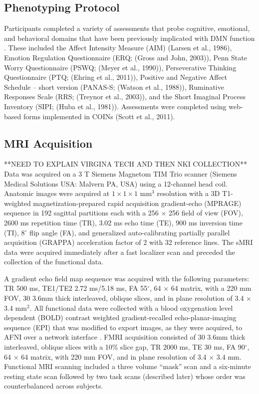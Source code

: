 \subsection{Phenotyping Protocol}
Participants completed a variety of assessments that probe cognitive, emotional, and behavioral domains that have been previously implicated with DMN function \cite{Andrews_Hanna2014,Buckner2008,Hamilton2011,Sheline2009}. These included the Affect Intensity Measure (AIM) (Larsen et al., 1986), Emotion Regulation Questionnaire (ERQ; (Gross and John, 2003)), Penn State Worry Questionnaire (PSWQ; (Meyer et al., 1990)), Perseverative Thinking Questionnaire (PTQ; (Ehring et al., 2011)), Positive and Negative Affect Schedule -- short version (PANAS-S; (Watson et al., 1988)), Ruminative Responses Scale (RRS; (Treynor et al., 2003)), and the Short Imaginal Process Inventory (SIPI; (Huba et al., 1981)). Assessments were completed using web-based forms implemented in COINs (Scott et al., 2011). 

\subsection{MRI Acquisition}
**NEED TO EXPLAIN VIRGINA TECH AND THEN NKI COLLECTION**
Data was acquired on a 3 T Siemens Magnetom TIM Trio scanner (Siemens Medical Solutions USA: Malvern PA, USA) using a 12-channel head coil. Anatomic images were acquired at $1 \times 1 \times 1$ mm$^{3}$ resolution with a 3D T1-weighted magnetization-prepared rapid acquisition gradient-echo (MPRAGE) sequence \cite{Mugler_1990} in 192 sagittal partitions each with a 256 $\times$ 256 field of view (FOV), 2600 ms repetition time (TR), 3.02 ms echo time (TE), 900 ms inversion time (TI), 8$^\circ$ flip angle (FA), and generalized auto-calibrating partially parallel acquisition (GRAPPA) \cite{Griswold_2002} acceleration factor of 2 with 32 reference lines. The sMRI data were acquired immediately after a fast localizer scan and preceded the collection of the functional data. 

A gradient echo field map sequence was acquired with the following parameters: TR 500 ms, TE1/TE2 2.72 ms/5.18 ms, FA 55$^\circ$, 64 $\times$ 64 matrix, with a 220 mm FOV, 30 3.6mm thick interleaved, oblique slices, and in plane resolution of 3.4 $\times$ 3.4 mm$^{2}$. All functional data were collected with a blood oxygenation level dependent (BOLD) contrast weighted gradient-recalled echo-planar-imaging sequence (EPI) that was modified to export images, as they were acquired, to AFNI over a network interface \cite{Cox_1995,Cox_1996,LaConte_2007}. FMRI acquisition consisted of 30 3.6mm thick interleaved, oblique slices with a 10\% slice gap, TR 2000 ms, TE 30 ms, FA 90$^\circ$, 64 $\times$ 64 matrix, with 220 mm FOV, and in plane resolution of 3.4 $\times$ 3.4 mm. Functional MRI scanning included a three volume ``mask'' scan and a six-minute resting state scan followed by two task scans (described later) whose order was counterbalanced across subjects.

